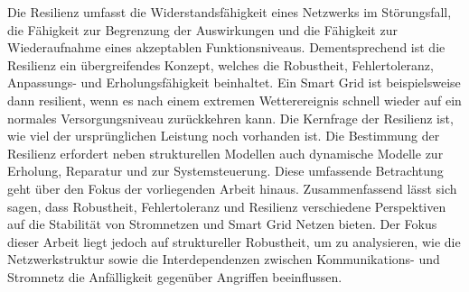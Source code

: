 Die Resilienz umfasst die Widerstandsfähigkeit eines Netzwerks im Störungsfall, die Fähigkeit zur Begrenzung der Auswirkungen und die Fähigkeit zur Wiederaufnahme eines akzeptablen Funktionsniveaus. Dementsprechend ist die Resilienz ein übergreifendes Konzept, welches die Robustheit, Fehlertoleranz, Anpassungs- und Erholungsfähigkeit beinhaltet. Ein Smart Grid ist beispielsweise dann resilient, wenn es nach einem extremen Wetterereignis schnell wieder auf ein normales Versorgungsniveau zurückkehren kann. 
Die Kernfrage der Resilienz ist, wie viel der ursprünglichen Leistung noch vorhanden ist. Die Bestimmung der Resilienz erfordert neben strukturellen Modellen auch dynamische Modelle zur Erholung, Reparatur und zur Systemsteuerung. Diese umfassende Betrachtung geht über den Fokus der vorliegenden Arbeit hinaus. 
Zusammenfassend lässt sich sagen, dass Robustheit, Fehlertoleranz und Resilienz verschiedene Perspektiven auf die Stabilität von Stromnetzen und Smart Grid Netzen bieten. Der Fokus dieser Arbeit liegt jedoch auf struktureller Robustheit, um zu analysieren, wie die Netzwerkstruktur sowie die Interdependenzen zwischen Kommunikations- und Stromnetz die Anfälligkeit gegenüber Angriffen beeinflussen.